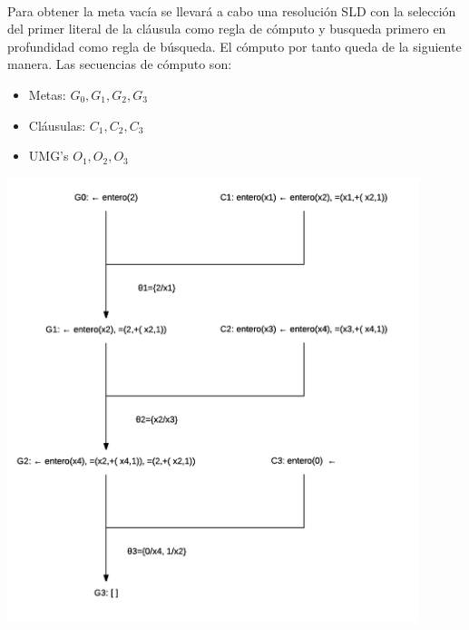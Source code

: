 \documentclass[11pt, a4paper,spanish]{article}
\begin{document}
		\paragraph{}
		Para obtener la meta vacía se llevará a cabo una resolución SLD con la selección del primer literal de la cláusula como regla de cómputo y busqueda primero en profundidad como regla de búsqueda. El cómputo por tanto queda de la siguiente manera. Las secuencias de cómputo son:
		\begin{itemize}
			\item Metas: $G_0, G_1, G_2,G_3$
			\item Cláusulas: $C_1, C_2,C_3$
			\item UMG's $O_1, O_2, O_3$
		\end{itemize}
		\includegraphics[width=0.9\textwidth]{sld-computation}
\end{document}

